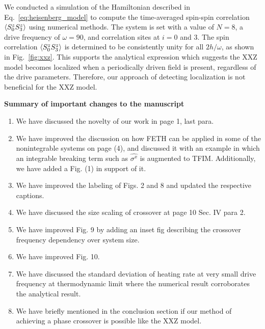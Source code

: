 \documentclass[aps,prb,reprint,showpacs,floatfix,superscriptaddress, onecolumn, nofootinbib, 9pt]{revtex4-2}
\begin{document}
\begin{enumerate}
{	We conducted a simulation of the Hamiltonian described in Eq.~\eqref{eq:heisenberg_model} to compute the time-averaged spin-spin correlation $\expval{S^z_0 S^z_3}$ using numerical methods. The system is set with a value of $N=8$, a drive frequency of $\omega=90$, and correlation sites at $i=0$ and $3$. The spin correlation $\expval{S^z_0 S^z_3}$ is determined to be consistently unity for all $2h/\omega$, as shown in Fig.~\ref{fig:xxz}. This supports the analytical expression which suggests the XXZ model becomes localized when a periodically driven field is present, regardless of the drive parameters. Therefore, our approach of detecting localization is not beneficial for the XXZ model.
	}
	\end{enumerate}
	
	\vskip 1cm 
	\noindent \textbf{Summary of important changes to the  manuscript}
	\begin{enumerate}
		\item We have discussed the novelty of our work in page 1, last para.
		\item We have improved the discussion on how FETH can be applied in some of the nonintegrable systems on page (4), and discussed it with an example in which an integrable breaking term such as $\hat{\sigma^x}$ is augmented to TFIM. Additionally, we have added a Fig. (1) in support of it.
		\item We have improved the labeling of Figs. 2 and 8 and updated the respective captions.
		\item We have discussed the size scaling of crossover at page 10 Sec. IV para 2.
		\item We have improved Fig. 9 by adding an inset fig describing the crossover frequency dependency over system size.
		\item We have improved Fig. 10.
		\item We have discussed the standard deviation of heating rate at very small drive frequency at thermodynamic limit where the numerical result corroborates the analytical result.
		\item We have briefly mentioned in the conclusion section if our method of achieving a phase crossover is possible like the XXZ model. 
	\end{enumerate}
	
	
	
	
\end{document}

